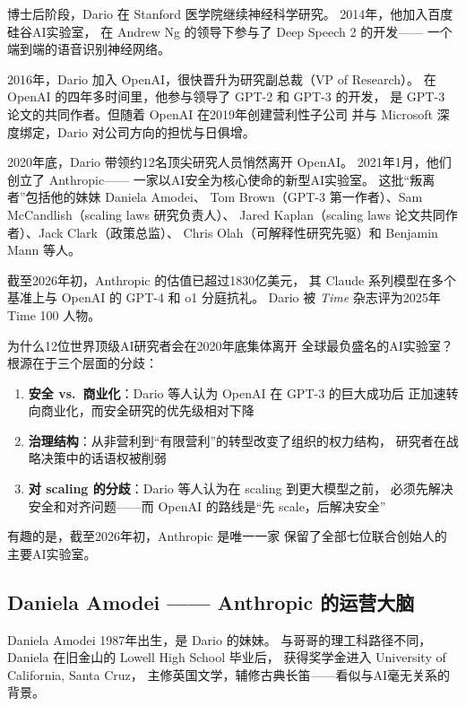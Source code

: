 博士后阶段，Dario 在 Stanford 医学院继续神经科学研究。
2014年，他加入百度硅谷AI实验室，
在 Andrew Ng 的领导下参与了 Deep Speech 2 的开发——
一个端到端的语音识别神经网络。

2016年，Dario 加入 OpenAI，很快晋升为研究副总裁（VP of Research）。
在 OpenAI 的四年多时间里，他参与领导了 GPT-2 和 GPT-3 的开发，
是 GPT-3 论文的共同作者。但随着 OpenAI 在2019年创建营利性子公司
并与 Microsoft 深度绑定，Dario 对公司方向的担忧与日俱增。

2020年底，Dario 带领约12名顶尖研究人员悄然离开 OpenAI。
2021年1月，他们创立了 Anthropic——
一家以AI安全为核心使命的新型AI实验室。
这批``叛离者''包括他的妹妹 Daniela Amodei、
Tom Brown（GPT-3 第一作者）、Sam McCandlish（scaling laws 研究负责人）、
Jared Kaplan（scaling laws 论文共同作者）、Jack Clark（政策总监）、
Chris Olah（可解释性研究先驱）和 Benjamin Mann 等人。

截至2026年初，Anthropic 的估值已超过1830亿美元，
其 Claude 系列模型在多个基准上与 OpenAI 的 GPT-4 和 o1 分庭抗礼。
Dario 被 \emph{Time} 杂志评为2025年 Time 100 人物。

\begin{whybox}
为什么12位世界顶级AI研究者会在2020年底集体离开
全球最负盛名的AI实验室？根源在于三个层面的分歧：

\begin{enumerate}[noitemsep]
  \item \textbf{安全 vs.\ 商业化}：Dario 等人认为 OpenAI 在 GPT-3 的巨大成功后
        正加速转向商业化，而安全研究的优先级相对下降
  \item \textbf{治理结构}：从非营利到``有限营利''的转型改变了组织的权力结构，
        研究者在战略决策中的话语权被削弱
  \item \textbf{对 scaling 的分歧}：Dario 等人认为在 scaling 到更大模型之前，
        必须先解决安全和对齐问题——而 OpenAI 的路线是``先 scale，后解决安全''
\end{enumerate}

有趣的是，截至2026年初，Anthropic 是唯一一家
保留了全部七位联合创始人的主要AI实验室。
\end{whybox}


\subsection{Daniela Amodei —— Anthropic 的运营大脑}
\label{subsec:daniela-amodei}

Daniela Amodei 1987年出生，是 Dario 的妹妹。
与哥哥的理工科路径不同，
Daniela 在旧金山的 Lowell High School 毕业后，
获得奖学金进入 University of California, Santa Cruz，
主修英国文学，辅修古典长笛——看似与AI毫无关系的背景。

